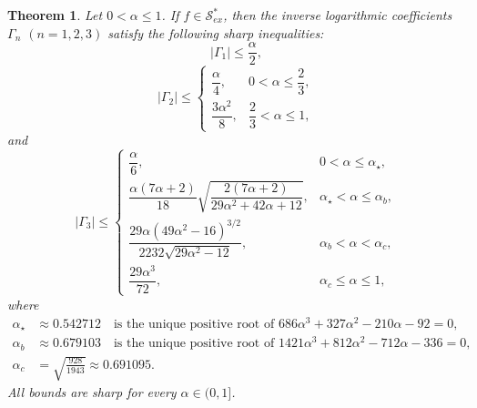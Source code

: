 \documentclass[10pt,a4paper]{amsart}
\newtheorem{theo}{Theorem}[section]
\numberwithin{equation}{section}
\begin{document}
\begin{theo}\label{T1}
Let $0<\alpha\le 1$. If $f\in \mathcal{S}_{ex}^{\ast}$, then the inverse logarithmic coefficients $\Gamma_n$ $(n=1,2,3)$ satisfy the following sharp inequalities:
\[
|\Gamma_1|\le \frac{\alpha}{2},
\]
\[
|\Gamma_2|\le
\begin{cases}
\dfrac{\alpha}{4}, & 0<\alpha\le \dfrac23,\\[6pt]
\dfrac{3\alpha^2}{8}, & \dfrac23<\alpha\le1,
\end{cases}
\]
and
\begin{equation}\label{ND3}
|\Gamma_3|\le 
\begin{cases}
\dfrac{\alpha}{6}, & 0<\alpha\le \alpha_\star,\\[8pt]
\dfrac{\alpha(7\alpha+2)}{18}
\sqrt{\dfrac{2(7\alpha+2)}{29\alpha^2+42\alpha+12}},
& \alpha_\star<\alpha\le \alpha_b,\\[8pt]
\dfrac{29\alpha(49\alpha^2-16)^{3/2}}
{2232\sqrt{29\alpha^2-12}},
& \alpha_b<\alpha<\alpha_c,\\[8pt]
\dfrac{29\alpha^3}{72}, & \alpha_c\le \alpha\le 1,
\end{cases}
\end{equation}
where
\[
\begin{aligned}
\alpha_\star &\approx 0.542712
\quad \text{is the unique positive root of } 686\alpha^3+327\alpha^2-210\alpha-92=0,\\[2mm]
\alpha_b &\approx 0.679103
\quad \text{is the unique positive root of } 1421\alpha^3+812\alpha^2-712\alpha-336=0,\\[2mm]
\alpha_c &=\sqrt{\frac{928}{1943}}\approx 0.691095.
\end{aligned}
\]
All bounds are sharp for every $\alpha\in(0,1]$.
\end{theo}
\end{document}
